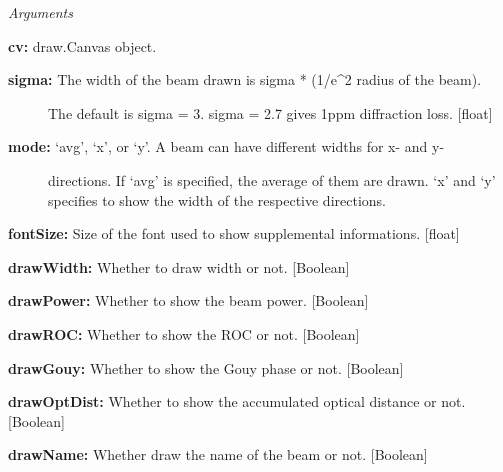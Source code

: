 \documentclass[letterpaper,10pt,english]{sphinxmanual}
\begin{document}
\begin{fulllineitems}
\begin{fulllineitems}
\emph{Arguments}

\textbf{cv:} draw.Canvas object.
\begin{description}
\item[{\textbf{sigma:} The width of the beam drawn is sigma * (1/e\textasciicircum{}2 radius of the beam).}] \leavevmode
The default is sigma = 3. sigma = 2.7 gives 1ppm diffraction loss.
{[}float{]}

\item[{\textbf{mode:} `avg', `x', or `y'. A beam can have different widths for x- and y-}] \leavevmode
directions. If `avg' is specified, the average of them are drawn.
`x' and `y' specifies to show the width of the respective directions.

\end{description}

\textbf{fontSize:} Size of the font used to show supplemental informations. {[}float{]}

\textbf{drawWidth:} Whether to draw width or not. {[}Boolean{]}

\textbf{drawPower:} Whether to show the beam power. {[}Boolean{]}

\textbf{drawROC:} Whether to show the ROC or not. {[}Boolean{]}

\textbf{drawGouy:} Whether to show the Gouy phase or not. {[}Boolean{]}

\textbf{drawOptDist:} Whether to show the accumulated optical distance or not. {[}Boolean{]}

\textbf{drawName:} Whether draw the name of the beam or not. {[}Boolean{]}

\end{fulllineitems}


\begin{fulllineitems}
\label{api/gtrace:gtrace.beam.GaussianBeam.drawWidth}
\end{fulllineitems}


\begin{fulllineitems}
\label{api/gtrace:gtrace.beam.GaussianBeam.drawWidthOld}
\end{fulllineitems}



\end{fulllineitems}
\end{document}
